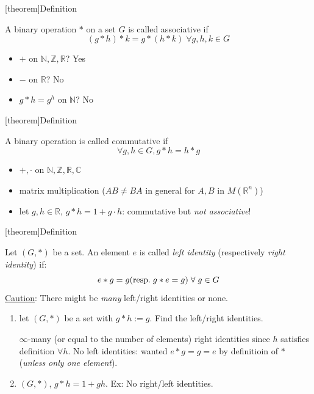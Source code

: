 \documentclass[12pt]{report}
\theoremstyle{definition}
\begin{document}
[theorem]{Definition}
\begin{Associativity}
    A binary operation $*$ on a set $G$ is called associative if\[
        (g*h)*k = g*(h*k) \;\forall g,h,k \in G
    \]
\end{Associativity}

\begin{ex}
    \;

    \begin{itemize}
        \item $+$ on $\mathbb{N, Z, R}$? Yes
        \item $-$ on $\mathbb{R}$? No
        \item $g*h = g^{h}$ on $\mathbb{N}$? No
    \end{itemize}
    
\end{ex}

[theorem]{Definition}
\begin{commutative}
    A binary operation is called commutative if \[
        \forall g, h \in G, g * h = h * g
    \]
\end{commutative}

\begin{ex}
    \;

    \begin{itemize}
        \item $+, \cdot$ on $\mathbb{N, Z, R, C}$
        \item matrix multiplication ($AB \neq BA$ in general for $A, B$ in $M(\mathbb{R}^{n})$)
        \item let $g, h \in \mathbb{R}$, $g * h = 1 + g \cdot h$: commutative but \emph{not associative}!
    \end{itemize}
    
\end{ex}

[theorem]{Definition}
\begin{identity element}
    Let $(G, *)$ be a set. An element $e$ is called \emph{left identity} (respectively \emph{right identity}) if:\[
        e * g = g (\textnormal{resp.}\; g * e = g) \;\forall\; g \in G
    \]
    \underline{Caution}: There might be \emph{many} left/right identities or none.
\end{identity element}

\begin{ex}
    \;

    \begin{enumerate}
        \item let $(G,*)$ be a set with $g*h:=g$.
            Find the left/right identities.

            $\infty$-many (or equal to the number of elements)
            right identities since $h$ satisfies definition $\forall h$.
            No left identities: wanted $e * g = g = e$ by definitioin of $*$ (\emph{unless only one element}).
        \item $(G, *)$, $g*h = 1 + gh$. 
            Ex: No right/left identities.
    \end{enumerate}
\end{ex}
\end{document}
